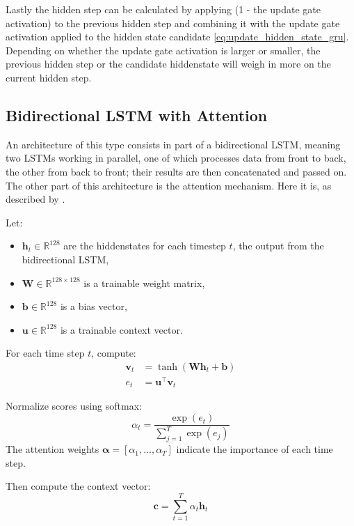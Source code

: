 \documentclass{article}
\begin{document}
Lastly the hidden step can be calculated by applying (1 - the update gate activation) to the previous hidden step and combining it with the update gate activation applied to the hidden state candidate \eqref{eq:update_hidden_state_gru}. Depending on whether the update gate activation is larger or smaller, the previous hidden step or the candidate hiddenstate will weigh in more on the current hidden step.

\subsection{Bidirectional LSTM with Attention}
An architecture of this type consists in part of a bidirectional LSTM, meaning two LSTMs working in parallel, one of which processes data from front to back, the other from back to front; their results are then concatenated and passed on.
\\[2em]
The other part of this architecture is the attention mechanism. Here it is, as described by \cite{bahdanau2016neuralmachinetranslationjointly}.

Let:
\begin{itemize}
    \item $\mathbf{h}_t \in \mathbb{R}^{128}$ are the hiddenstates for each timestep $t$, the output from the bidirectional LSTM,
    \item $\mathbf{W} \in \mathbb{R}^{128 \times 128}$ is a trainable weight matrix,
    \item $\mathbf{b} \in \mathbb{R}^{128}$ is a bias vector,
    \item $\mathbf{u} \in \mathbb{R}^{128}$ is a trainable context vector.
\end{itemize}

For each time step $t$, compute:
\begin{align}
    \mathbf{v}_t &= \tanh\!\left( \mathbf{W} \mathbf{h}_t + \mathbf{b} \right) \label{eq:v_bahdanau} \\
    e_t &= \mathbf{u}^\top \mathbf{v}_t \label{eq:attention_score}
\end{align}

Normalize scores using softmax:
\begin{equation}
    \alpha_t = \frac{\exp(e_t)}{\sum_{j=1}^{T} \exp(e_j)} \label{eq:alpha_score}
\end{equation}
The attention weights $\boldsymbol{\alpha} = [\alpha_1, \dots, \alpha_T]$ indicate the importance of each time step.

Then compute the context vector:
\begin{equation}
    \mathbf{c} = \sum_{t=1}^{T} \alpha_t \mathbf{h}_t \label{eq:attention_context}
\end{equation}
\end{document}
